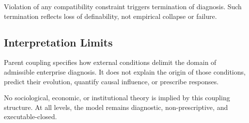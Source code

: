 Violation of any compatibility constraint triggers termination of
diagnosis.
Such termination reflects loss of definability, not empirical collapse
or failure.

\subsection{Interpretation Limits}

Parent coupling specifies how external conditions delimit the domain of
admissible enterprise diagnosis.
It does not explain the origin of those conditions, predict their
evolution, quantify causal influence, or prescribe responses.

No sociological, economic, or institutional theory is implied by this
coupling structure.
At all levels, the model remains diagnostic, non-prescriptive, and
executable-closed.

